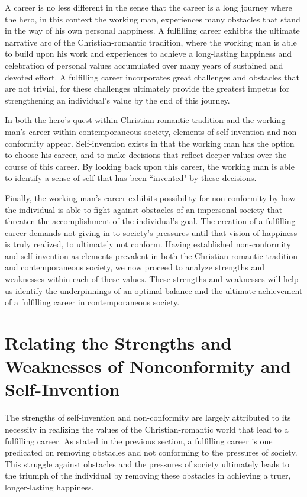 \documentclass[12pt,letterpaper]{article}
\begin{document}
A career is no less different in the sense that the career is a long journey where the hero, in this context the working man, experiences many obstacles that stand in the way of his own personal happiness.  A fulfilling career exhibits the ultimate narrative arc of the Christian-romantic tradition, where the working man is able to build upon his work and experiences to achieve a long-lasting happiness and celebration of personal values accumulated over many years of sustained and devoted effort.  A fulfilling career incorporates great challenges and obstacles that are not trivial, for these challenges ultimately provide the greatest impetus for strengthening an individual's value by the end of this journey.

In both the hero's quest within Christian-romantic tradition and the working man's career within contemporaneous society, elements of self-invention and non-conformity appear.  Self-invention exists in that the working man has the option to choose his career, and to make decisions that reflect deeper values over the course of this career.  By looking back upon this career, the working man is able to identify a sense of self that has been ``invented" by these decisions.  

Finally, the working man's career exhibits possibility for non-conformity by how the individual is able to fight against obstacles of an impersonal society that threaten the accomplishment of the individual's goal.  The creation of a fulfilling career demands not giving in to society's pressures until that vision of happiness is truly realized, to ultimately not conform.  Having established non-conformity and self-invention as elements prevalent in both the Christian-romantic tradition and contemporaneous society, we now proceed to analyze strengths and weaknesses within each of these values.  These strengths and weaknesses will help us identify the underpinnings of an optimal balance and the ultimate achievement of a fulfilling career in contemporaneous society.

\section{Relating the Strengths and Weaknesses of Nonconformity and Self-Invention}

The strengths of self-invention and non-conformity are largely attributed to its necessity in realizing the values of the Christian-romantic world that lead to a fulfilling career.  As stated in the previous section, a fulfilling career is one  predicated on removing obstacles and not conforming to the pressures of society.  This struggle against obstacles and the pressures of society ultimately leads to the triumph of the individual by removing these obstacles in achieving a truer, longer-lasting happiness.
\end{document}
